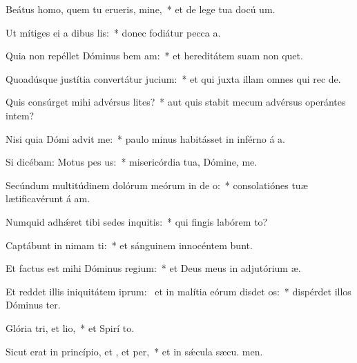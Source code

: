 \item Beátus homo, quem tu erueris, mine,~* et de lege tua docú um.
\item Ut mítiges ei a dibus lis:~* donec fodiátur pecca a.
\item Quia non repéllet Dóminus bem am:~* et hereditátem suam non quet.
\item Quoadúsque justítia convertátur  jucium:~* et qui juxta illam omnes qui rec  de.
\item Quis consúrget mihi advérsus lites?~* aut quis stabit mecum advérsus operántes intem?
\item Nisi quia Dómi advit me:~* paulo minus habitásset in inférno á a.
\item Si dicébam: Motus  pes us:~* misericórdia tua, Dómine,  me.
\item Secúndum multitúdinem dolórum meórum in de o:~* consolatiónes tuæ lætificavérunt á am.
\item Numquid adhǽret tibi sedes inquitis:~* qui fingis labórem  to?
\item Captábunt in nimam ti:~* et sánguinem innocéntem bunt.
\item Et factus est mihi Dóminus  regium:~* et Deus meus in adjutórium  æ.
\item Et reddet illis iniquitátem iprum:~\pscross{} et in malítia eórum disdet os:~* dispérdet illos Dóminus  ter.
\item Glória tri, et lio,~* et Spirí to.
\item Sicut erat in princípio, et , et per,~* et in sǽcula sæcu. men.
